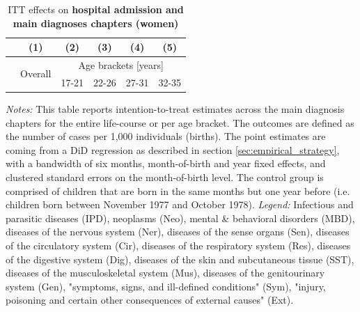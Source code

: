 \documentclass[11pt, a4paper,draft]{article} %
\begin{document}
\newpage
{} 
\vspace*{\fill}
\begin{table}[H] \centering 
	\begin{threeparttable} \centering \caption{ITT effects on \textbf{hospital admission and main diagnoses chapters (women)}}\label{tab: ITT_across_chapters_per_age_group_women}
		{\def\sym#1{\ifmmode^{#1}\else\(^{#1}\)\fi} 
			\begin{tabular}{l*{5}{c}}
				\toprule 
				&\multicolumn{1}{c}{(1)}&\multicolumn{1}{c}{(2)}&\multicolumn{1}{c}{(3)}&\multicolumn{1}{c}{(4)}&\multicolumn{1}{c}{(5)}\\
				\midrule
				&\multirow{2}{*}{Overall} & \multicolumn{4}{c}{Age brackets [years]} \\ 
				\cmidrule(lr){3-6}
				&&\multicolumn{1}{c}{17-21}&\multicolumn{1}{c}{22-26}&\multicolumn{1}{c}{27-31}&\multicolumn{1}{c}{32-35}\\
				
				\midrule
				
				
				
				\bottomrule 
		\end{tabular}}
	\end{threeparttable} 
	\begin{minipage}{0.9\linewidth}
		\scriptsize \emph{Notes:} This table reports intention-to-treat estimates across the main diagnosis chapters for the entire life-course or per age bracket. The outcomes are defined as the number of cases per 1,000 individuals (births). The point estimates are coming from a DiD regression as described in section \ref{sec:empirical_strategy}, with a bandwidth of six months, month-of-birth and year fixed effects, and clustered standard errors on the month-of-birth level. The control group is comprised of children that are born in the same months but one year before (i.e. children born between November 1977 and October 1978).\newline
		\emph{Legend:} Infectious and parasitic diseases (IPD), neoplasms (Neo), mental \& behavioral disorders (MBD), diseases of the nervous system (Ner), diseases of the sense organs (Sen), diseases of the circulatory system (Cir), diseases of the respiratory system (Res), diseases of the digestive system (Dig), diseases of the skin and subcutaneous tissue (SST), diseases of the musculoskeletal system (Mus), diseases of the genitourinary system (Gen), "symptoms, signs, and ill-defined conditions" (Sym), "injury, poisoning and certain other consequences of external causes" (Ext).
	\end{minipage}
\end{table} 
\vspace*{\fill}\clearpage 
\restoregeometry
\end{document}
